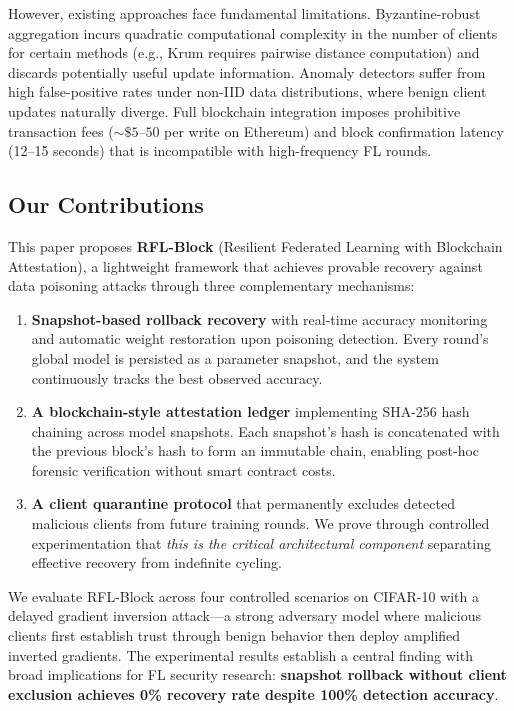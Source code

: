 \documentclass[conference]{IEEEtran}
\begin{document}
However, existing approaches face fundamental limitations. Byzantine-robust aggregation incurs quadratic computational complexity in the number of clients for certain methods (e.g., Krum requires pairwise distance computation) and discards potentially useful update information. Anomaly detectors suffer from high false-positive rates under non-IID data distributions, where benign client updates naturally diverge. Full blockchain integration imposes prohibitive transaction fees ($\sim\$5$--$50$ per write on Ethereum) and block confirmation latency (12--15 seconds) that is incompatible with high-frequency FL rounds.

\subsection{Our Contributions}
This paper proposes \textbf{RFL-Block} (Resilient Federated Learning with Blockchain Attestation), a lightweight framework that achieves provable recovery against data poisoning attacks through three complementary mechanisms:

\begin{enumerate}
    \item \textbf{Snapshot-based rollback recovery} with real-time accuracy monitoring and automatic weight restoration upon poisoning detection. Every round's global model is persisted as a parameter snapshot, and the system continuously tracks the best observed accuracy.
    \item \textbf{A blockchain-style attestation ledger} implementing SHA-256 hash chaining across model snapshots. Each snapshot's hash is concatenated with the previous block's hash to form an immutable chain, enabling post-hoc forensic verification without smart contract costs.
    \item \textbf{A client quarantine protocol} that permanently excludes detected malicious clients from future training rounds. We prove through controlled experimentation that \emph{this is the critical architectural component} separating effective recovery from indefinite cycling.
\end{enumerate}

We evaluate RFL-Block across four controlled scenarios on CIFAR-10 with a delayed gradient inversion attack---a strong adversary model where malicious clients first establish trust through benign behavior then deploy amplified inverted gradients. The experimental results establish a central finding with broad implications for FL security research: \textbf{snapshot rollback without client exclusion achieves 0\% recovery rate despite 100\% detection accuracy}.
\end{document}
